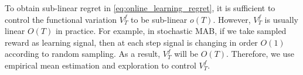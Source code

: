 To obtain sub-linear regret in \cref{eq:online_learning_regret}, it is sufficient to control the functional variation $V_T^f$ to be sub-linear $o(T)$. However, $V_T^f$ is usually linear $O(T)$ in practice. For example, in stochastic MAB, if we take sampled reward as learning signal, then at each step signal is changing in order $O(1)$ according to random sampling. As a result, $V_T^f$ will be $O(T)$. Therefore, we use empirical mean estimation and exploration to control $V_T^f$.
